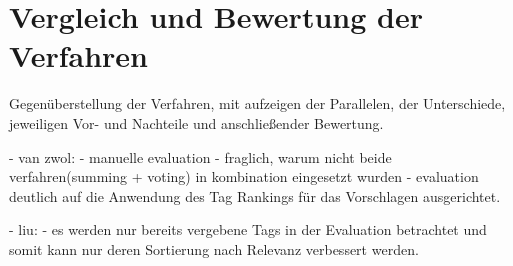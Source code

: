 \section{Vergleich und Bewertung der Verfahren} %
\label{sec:vergleich_und_bewertung_der_verfahren}
Gegenüberstellung der Verfahren, mit aufzeigen der Parallelen, der Unterschiede, jeweiligen Vor- und Nachteile und anschließender Bewertung.


- van zwol: 
 - manuelle evaluation
 - fraglich, warum nicht beide verfahren(summing + voting) in kombination eingesetzt wurden
 - evaluation deutlich auf die Anwendung des Tag Rankings für das Vorschlagen ausgerichtet.
 
- liu:
 - es werden nur bereits vergebene Tags in der Evaluation betrachtet und somit kann nur deren Sortierung nach Relevanz verbessert werden.

